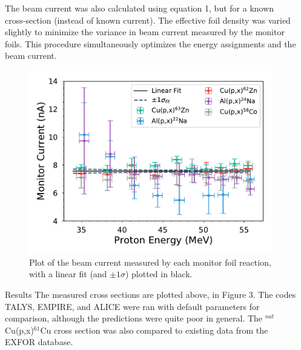 \documentclass[final]{beamer}
\newlength{\onecolwid}
\newlength{\threecolwid}
\begin{document}
\begin{frame}[t]
\begin{columns}[t]
\begin{column}{\threecolwid}
\begin{columns}[t,totalwidth=\threecolwid]
\begin{column}{\onecolwid}
\end{column} %
\begin{column}{\onecolwid} %

\begin{block}


\small{\hspace*{50pt}The beam current was also calculated using equation 1, but for a known cross-section (instead of known current).  The effective foil density was varied slightly to minimize the variance in beam current measured by the monitor foils.  This procedure simultaneously optimizes the energy assignments and the beam current.}

\begin{figure}
\includegraphics[width=0.8\linewidth]{monitors/current_norm_mcnp.pdf}
\caption{\hspace*{15pt}Plot of the beam current measured by each monitor foil reaction, with a linear fit (and $\pm 1 \sigma$) plotted in black.
}
\end{figure}
\end{block}

\begin{block}{Results}
\small{\hspace*{50pt}The measured cross sections are plotted above, in Figure 3.  The codes TALYS, EMPIRE, and ALICE were ran with default parameters for comparison, although the predictions were quite poor in general.  The $^{nat}$Cu(p,x)$^{61}$Cu cross section was also compared to existing data from the EXFOR database.}
\end{block}


\end{column}
\end{columns}
\end{column}
\end{columns}
\end{frame}
\end{document}
